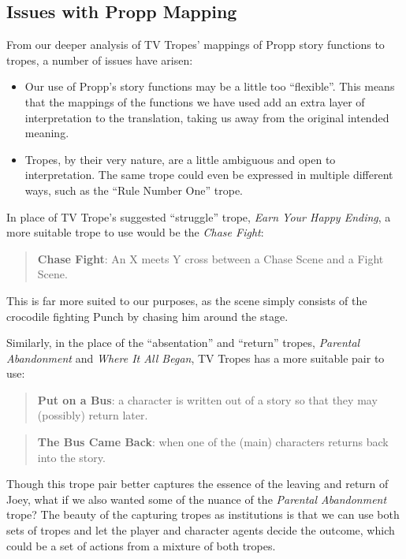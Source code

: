\documentclass[11pt]{report}
\begin{document}
\subsection{Issues with Propp Mapping}
From our deeper analysis of TV Tropes' mappings of Propp story functions to
tropes, a number of issues have arisen:

\begin{itemize}
  \item Our use of Propp's story functions may be a little too ``flexible''.
    This means that the mappings of the functions we have used add an extra
    layer of interpretation to the translation, taking us away from the original
    intended meaning.
  \item Tropes, by their very nature, are a little ambiguous and open to
    interpretation. The same trope could even be expressed in multiple different
    ways, such as the ``Rule Number One'' trope.
\end{itemize}

In place of TV Trope's suggested ``struggle'' trope, \emph{Earn Your Happy
  Ending}, a more suitable trope to use would be the \emph{Chase Fight}:

\begin{quote}
\textbf{Chase Fight}: An X meets Y cross between a Chase Scene and a Fight Scene.
\end{quote}

This is far more suited to our purposes, as the scene simply consists of the
crocodile fighting Punch by chasing him around the stage.

Similarly, in the place of the ``absentation'' and ``return'' tropes,
\emph{Parental Abandonment} and \emph{Where It All Began}, TV Tropes has a more
suitable pair to use:

\begin{quote}
\textbf{Put on a Bus}: a character is written out of a story so that they may
(possibly) return later.
\end{quote}

\begin{quote}
\textbf{The Bus Came Back}: when one of the (main) characters returns back into
the story.
\end{quote}

Though this trope pair better captures the essence of the leaving and return of
Joey, what if we also wanted some of the nuance of the \emph{Parental
  Abandonment} trope? The beauty of the capturing tropes as institutions is that
we can use both sets of tropes and let the player and character agents decide
the outcome, which could be a set of actions from a mixture of both tropes.
\end{document}
